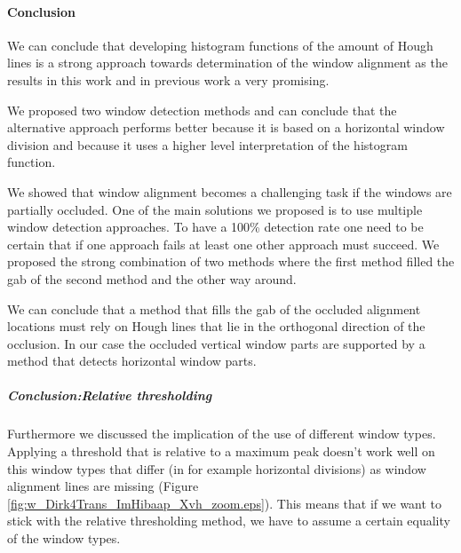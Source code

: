 
\paragraph{Conclusion}
We can conclude that developing histogram functions of the amount of Hough lines
is a strong approach towards determination of the window alignment as the
results in this work and in previous work a very promising.

We proposed two window detection methods and can conclude that the alternative
approach performs better because it is based on a horizontal window division and
because it uses a higher level interpretation of the histogram function.

We showed that window alignment becomes a challenging task if the windows are partially
occluded.  One of the main solutions we proposed is to use multiple window
detection approaches.  To have a 100\% detection rate one need to be certain
that if one approach fails at least one other approach must succeed.  We
proposed the strong combination of two methods where the first method filled the
gab of the second method and the other way around.

We can conclude that a method that fills the gab of the occluded alignment locations
must rely on Hough lines that lie in the orthogonal direction of the occlusion.
In our case the occluded vertical window parts are supported by a method that
detects horizontal window parts.

\subparagraph{Conclusion:Relative thresholding}
Furthermore we discussed the implication of the use of different window types.
Applying a threshold that is relative to a maximum peak doesn't work well on
this window types that differ (in for example horizontal divisions) as window
alignment lines are missing (Figure
\ref{fig:w_Dirk4Trans_ImHibaap_Xvh_zoom.eps}).  This means that if we want to
stick with the relative thresholding method, we have to assume a certain
equality of the window types. 





